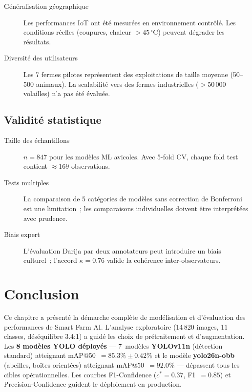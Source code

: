 \begin{description}
  \item[Généralisation géographique] Les performances IoT ont été mesurées en
        environnement contrôlé. Les conditions réelles (coupures, chaleur $> 45\,^{\circ}\mathrm{C}$)
        peuvent dégrader les résultats.
  \item[Diversité des utilisateurs] Les 7 fermes pilotes représentent des exploitations
        de taille moyenne (50--500 animaux). La scalabilité vers des fermes industrielles
        ($> 50\,000$ volailles) n'a pas été évaluée.
\end{description}

\subsection{Validité statistique}

\begin{description}
  \item[Taille des échantillons] $n = 847$ pour les modèles ML avicoles. Avec 5-fold CV,
        chaque fold test contient $\approx 169$ observations.
  \item[Tests multiples] La comparaison de 5 catégories de modèles sans correction de
        Bonferroni est une limitation~; les comparaisons individuelles doivent être
        interprétées avec prudence.
  \item[Biais expert] L'évaluation Darija par deux annotateurs peut introduire un biais
        culturel~; l'accord $\kappa = 0.76$ valide la cohérence inter-observateurs.
\end{description}

\section*{Conclusion}

Ce chapitre a présenté la démarche complète de modélisation et d'évaluation des
performances de Smart Farm AI. L'analyse exploratoire (14\,820 images, 11 classes,
déséquilibre 3.4:1) a guidé les choix de prétraitement et d'augmentation. Les
\textbf{8 modèles YOLO déployés} — 7~modèles \textbf{YOLOv11n} (détection standard)
atteignant mAP@50~$= 85.3\% \pm 0.42\%$ et le modèle \textbf{yolo26n-obb}
(abeilles, boîtes orientées) atteignant mAP@50~$= 92.0\%$ — dépassent tous les
cibles opérationnelles. Les courbes F1-Confidence ($c^* = 0.37$, F1~$= 0.85$)
et Precision-Confidence guident le déploiement en production.

